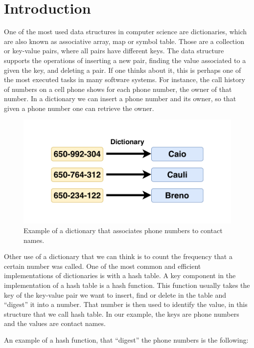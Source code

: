 \chapter{Introduction}
\label{cap:Introduction}

One of the most used data structures in computer science are dictionaries, which are also known as associative array, map or symbol table. Those are a collection or key-value pairs, where all pairs have different keys. The data structure supports the operations of inserting a new pair, finding the value associated to a given the key, and deleting a pair. If one thinks about it, this is perhaps one of the most executed tasks in many software systems. For instance, the call history of numbers on a cell phone shows for each phone number, the owner of that number. In a dictionary we can insert a phone number and its owner, so that given a phone number one can retrieve the owner. 


\begin{figure}[h!]
  \centering
  \includegraphics[width=12cm]{figuras/dictionary-example.pdf}
  \caption{Example of a dictionary that associates phone numbers to contact names. }
\end{figure}

Other use of a dictionary that we can think is to count the frequency that a certain number was called. One of the most common and efficient implementations of dictionaries is with a hash table. A key component in the implementation of a hash table is a hash function. This function usually takes the key of the key-value pair we want to insert, find or delete in the table and ``digest'' it into a number. That number is then used to identify the value, in this structure that we call hash table. In our example, the keys are phone numbers and the values are contact names.

An example of a hash function, that ``digest'' the phone numbers is the following: \\

